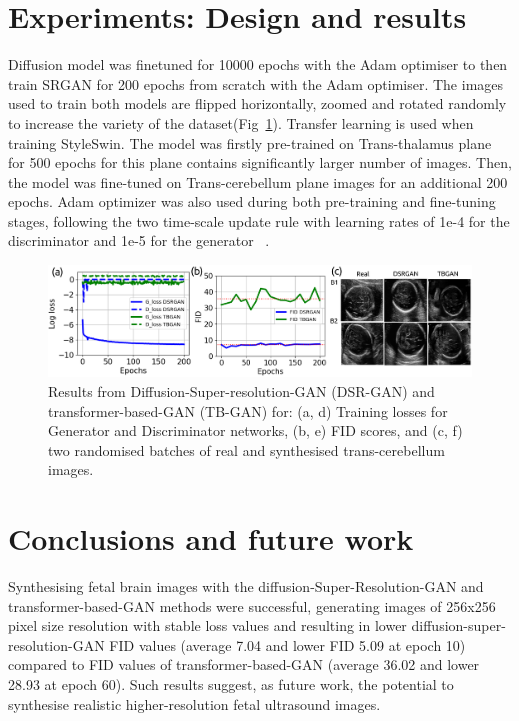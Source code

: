 \documentclass{midl} %
\begin{document}
\section{Experiments: Design and results}
Diffusion model was finetuned for 10000 epochs with the Adam optimiser to then train SRGAN for 200 epochs from scratch with the Adam optimiser. The images used to train both models are flipped horizontally, zoomed and rotated randomly to increase the variety of the dataset(Fig~\ref{fig:main_results}).
Transfer learning is used when training StyleSwin. The model was firstly pre-trained on Trans-thalamus plane for 500 epochs for this plane contains significantly larger number of images. Then, the model was fine-tuned on Trans-cerebellum plane images for an additional 200 epochs. Adam optimizer was also used during both pre-training and fine-tuning stages, following the two time-scale update rule with learning rates of 1e-4 for the discriminator and 1e-5 for the generator ~\cite{Heuvel2018}. 
\begin{figure}[htbp]
    \centering
    \includegraphics[width=0.99\columnwidth]{../figures/main-results/outputs/drawing-v00}%
\caption{
	Results from Diffusion-Super-resolution-GAN (DSR-GAN) and transformer-based-GAN (TB-GAN) for:
	(a, d) Training losses for Generator and Discriminator networks,
	(b, e) FID scores, and
	(c, f) two randomised batches of real and synthesised trans-cerebellum images.
    }
\label{fig:main_results}
\end{figure}    

\section{Conclusions and future work}
Synthesising fetal brain images with the diffusion-Super-Resolution-GAN and transformer-based-GAN methods were successful, generating images of 256x256 pixel size resolution with stable loss values and 
resulting in lower diffusion-super-resolution-GAN FID values (average 7.04 and lower FID 5.09 at epoch 10) compared to FID values of transformer-based-GAN (average 36.02 and lower 28.93 at epoch 60).
Such results suggest, as future work, the potential to synthesise realistic higher-resolution fetal ultrasound images.




\end{document}
